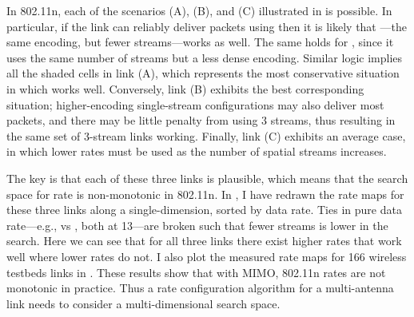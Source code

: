 In 802.11n, each of the scenarios (A), (B), and (C) illustrated in  is possible. In particular, if the link can reliably deliver packets using  then it is likely that ---the same encoding, but fewer streams---works as well. The same holds for , since it uses the same number of streams but a less dense encoding. Similar logic implies all the shaded cells in link (A), which represents the most conservative situation in which  works well. Conversely, link (B) exhibits the best corresponding situation; higher-encoding single-stream configurations may also deliver most packets, and there may be little penalty from using 3 streams, thus resulting in the same set of 3-stream links working. Finally, link (C) exhibits an average case, in which lower rates must be used as the number of spatial streams increases.

The key is that each of these three links is plausible, which means that the search space for rate is non-monotonic in 802.11n. In , I have redrawn the rate maps for these three links along a single-dimension, sorted by data rate. Ties in pure data rate---e.g.,  vs , both at 13\Mbps---are broken such that fewer streams is lower in the search. Here we can see that for all three links there exist higher rates that work well where lower rates do not. I also plot the measured rate maps for 166 wireless testbeds links in . These results show that with MIMO, 802.11n rates are not monotonic in practice. Thus a rate configuration algorithm for a multi-antenna link needs to consider a multi-dimensional search space.


